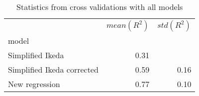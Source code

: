 
\begin{table}[H]
    \centering
    \caption{Statistics from cross validations with all models}
   \begin{tabular}{lrr}
\toprule
{} &  $mean(R^2)$ &  $std(R^2)$ \\
model                      &              &             \\
\midrule
Simplified Ikeda           &         0.31 &             \\
Simplified Ikeda corrected &         0.59 &        0.16 \\
New regression             &         0.77 &        0.10 \\
\bottomrule
\end{tabular}

    \label{tab:crossvalidation}
\end{table}
    